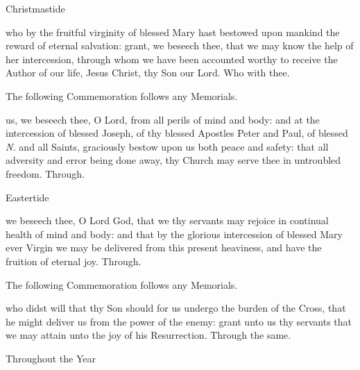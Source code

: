 
\collect

\begin{inhead}
	Christmastide
\end{inhead}

 who by the fruitful virginity of blessed Mary hast bestowed upon mankind the reward of eternal salvation: grant, we beseech thee, that we may know the help of her intercession, through whom we have been accounted worthy to receive the Author of our life, Jesus Christ, thy Son our Lord. Who with thee.

\begin{rubric}
	The following Commemoration follows any Memorials.
\end{rubric}

 us, we beseech thee, O Lord, from all perils of mind and body: and at the intercession of blessed Joseph, of thy blessed Apostles Peter and Paul, of blessed \textit{N.} and all Saints, graciously bestow upon us both peace and safety: that all adversity and error being done away, thy Church may serve thee in untroubled freedom. Through.\\

\begin{inhead}
	Eastertide
\end{inhead}

 we beseech thee, O Lord God, that we thy servants may rejoice in continual health of mind and body: and that by the glorious intercession of blessed Mary ever Virgin we may be delivered from this present heaviness, and have the fruition of eternal joy. Through.

\begin{rubric}
	The following Commemoration follows any Memorials.
\end{rubric}

 who didst will that thy Son should for us undergo the burden of the Cross, that he might deliver us from the power of the enemy: grant unto us thy servants that we may attain unto the joy of his Resurrection. Through the same.\\


\begin{inhead}
	Throughout the Year
\end{inhead}

